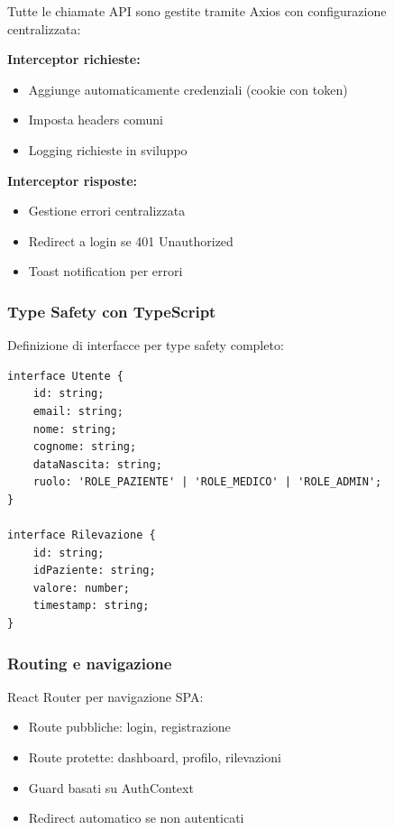 \documentclass{report}
\begin{document}
Tutte le chiamate API sono gestite tramite Axios con configurazione centralizzata:

\textbf{Interceptor richieste:}
\begin{itemize}
    \item Aggiunge automaticamente credenziali (cookie con token)
    \item Imposta headers comuni
    \item Logging richieste in sviluppo
\end{itemize}

\textbf{Interceptor risposte:}
\begin{itemize}
    \item Gestione errori centralizzata
    \item Redirect a login se 401 Unauthorized
    \item Toast notification per errori
\end{itemize}

\subsubsection{Type Safety con TypeScript}

Definizione di interfacce per type safety completo:

\begin{verbatim}
interface Utente {
    id: string;
    email: string;
    nome: string;
    cognome: string;
    dataNascita: string;
    ruolo: 'ROLE_PAZIENTE' | 'ROLE_MEDICO' | 'ROLE_ADMIN';
}

interface Rilevazione {
    id: string;
    idPaziente: string;
    valore: number;
    timestamp: string;
}
\end{verbatim}

\subsubsection{Routing e navigazione}

React Router per navigazione SPA:

\begin{itemize}
    \item Route pubbliche: login, registrazione
    \item Route protette: dashboard, profilo, rilevazioni
    \item Guard basati su AuthContext
    \item Redirect automatico se non autenticati
\end{itemize}
\end{document}
